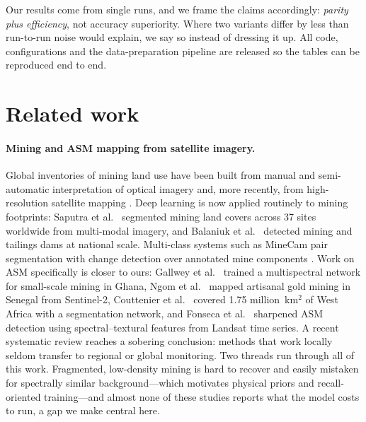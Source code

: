 \documentclass[review]{elsarticle}
\begin{document}
Our results come from single runs, and we frame the claims accordingly: \emph{parity plus
efficiency}, not accuracy superiority. Where two variants differ by less than run-to-run
noise would explain, we say so instead of dressing it up. All code, configurations and the
data-preparation pipeline are released so the tables can be reproduced end to end.

\section{Related work}\label{sec:related}

\paragraph{Mining and ASM mapping from satellite imagery.}
Global inventories of mining land use have been built from manual and semi-automatic
interpretation of optical imagery \citep{maus2022global} and, more recently, from
high-resolution satellite mapping \citep{tang2023mining}. Deep learning is now applied
routinely to mining footprints: Saputra et al.\ \cite{saputra2025multimodal} segmented
mining land covers across 37 sites worldwide from multi-modal imagery, and Balaniuk et al.\
\cite{balaniuk2020mining} detected mining and tailings dams at national scale. Multi-class
systems such as MineCam pair segmentation with change detection over annotated mine
components \citep{jablonska2024minecam}. Work on ASM specifically is closer to ours: Gallwey
et al.\ \cite{gallwey2020asm} trained a multispectral network for small-scale mining in
Ghana, Ngom et al.\ \cite{ngom2020senegal} mapped artisanal gold mining in Senegal from
Sentinel-2, Couttenier et al.\ \cite{couttenier2022asm} covered 1.75 million~km$^2$ of West
Africa with a segmentation network, and Fonseca et al.\ \cite{fonseca2024asm} sharpened ASM
detection using spectral--textural features from Landsat time series. A recent systematic
review \citep{nursamsi2024review} reaches a sobering conclusion: methods that work locally
seldom transfer to regional or global monitoring. Two threads run through all of this work.
Fragmented, low-density mining is hard to recover and easily mistaken for spectrally similar
background---which motivates physical priors and recall-oriented training---and almost none
of these studies reports what the model costs to run, a gap we make central here.
\end{document}
